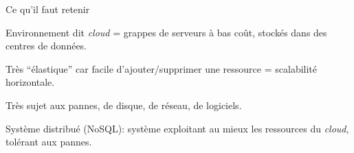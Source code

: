 \begin{frame}{Ce qu'il faut retenir}

Environnement dit \textit{cloud} = grappes de serveurs à bas coût, stockés dans des centres de données.

\vfill

Très ``élastique'' car facile d'ajouter/supprimer une ressource = \alert{scalabilité horizontale}.

\vfill

Très sujet aux \alert{pannes}, de disque, de réseau, de logiciels.

\vfill

Système distribué (NoSQL): système exploitant au mieux les ressources du \textit{cloud}, tolérant aux pannes.

 
\end{frame}





